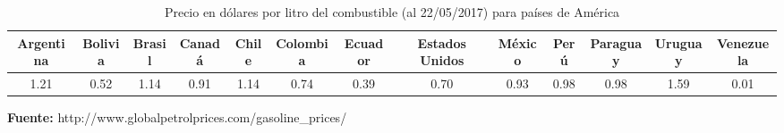 \documentclass{article}
\begin{document}
\begin{table}[ht]
\caption{Precio en dólares por litro del combustible (al 22/05/2017) para países de América} 
\resizebox{17cm}{!} {
\begin{tabular}{c c c c c c c c c c c c c} %
\hline\hline %
Argentina & Bolivia & Brasil & Canadá & Chile & Colombia & Ecuador & Estados Unidos & México & Perú & Paraguay & Uruguay & Venezuela \\ [0.5ex] %
\hline %
1.21 & 0.52 & 1.14 & 0.91 & 1.14 & 0.74 & 0.39 & 0.70 & 0.93 & 0.98 & 0.98 & 1.59 & 0.01 \\ [1ex] %
\hline %
\end{tabular}%
}
\label{table:nonlin} %
\end{table}
\FloatBarrier 
\noindent\textbf{Fuente:} http://www.globalpetrolprices.com/gasoline\_prices/\newline
\end{document}
